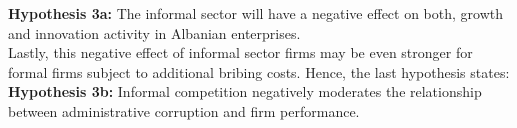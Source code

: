 \textbf{Hypothesis 3a:} The informal sector will have a negative effect on both, growth and innovation activity in Albanian enterprises. \\

Lastly, this negative effect of informal sector firms may be even stronger for formal firms subject to additional bribing costs. Hence, the last hypothesis states: \\

\textbf{Hypothesis 3b:} Informal competition negatively moderates the relationship between administrative corruption and firm performance. \\





